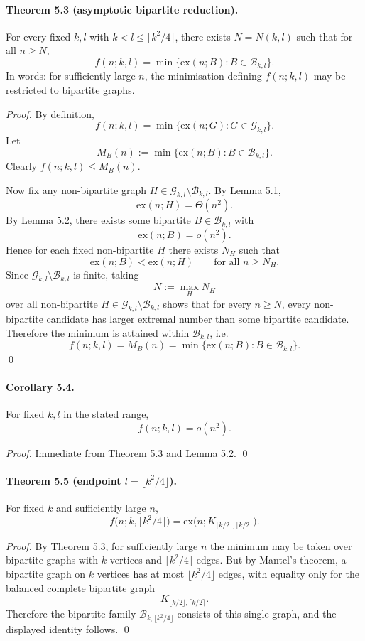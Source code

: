 \paragraph{Theorem 5.3 (asymptotic bipartite reduction).}
For every fixed $k,l$ with $k<l\le \lfloor k^2/4\rfloor$, there exists $N=N(k,l)$ such that for all $n\ge N$,
\[
f(n;k,l)=\min\{\mathrm{ex}(n;B): B\in \mathcal B_{k,l}\}.
\]
In words: for sufficiently large $n$, the minimisation defining $f(n;k,l)$ may be restricted to bipartite graphs.

\emph{Proof.}
By definition,
\[
f(n;k,l)=\min\{\mathrm{ex}(n;G): G\in \mathcal G_{k,l}\}.
\]
Let
\[
M_B(n):=\min\{\mathrm{ex}(n;B): B\in \mathcal B_{k,l}\}.
\]
Clearly $f(n;k,l)\le M_B(n)$.

Now fix any non-bipartite graph $H\in \mathcal G_{k,l}\setminus \mathcal B_{k,l}$. By Lemma 5.1,
\[
\mathrm{ex}(n;H)=\Theta(n^2).
\]
By Lemma 5.2, there exists some bipartite $B\in \mathcal B_{k,l}$ with
\[
\mathrm{ex}(n;B)=o(n^2).
\]
Hence for each fixed non-bipartite $H$ there exists $N_H$ such that
\[
\mathrm{ex}(n;B)<\mathrm{ex}(n;H)\qquad\text{for all }n\ge N_H.
\]
Since $\mathcal G_{k,l}\setminus \mathcal B_{k,l}$ is finite, taking
\[
N:=\max_H N_H
\]
over all non-bipartite $H\in \mathcal G_{k,l}\setminus \mathcal B_{k,l}$ shows that for every $n\ge N$, every non-bipartite candidate has larger extremal number than some bipartite candidate. Therefore the minimum is attained within $\mathcal B_{k,l}$, i.e.
\[
f(n;k,l)=M_B(n)=\min\{\mathrm{ex}(n;B): B\in \mathcal B_{k,l}\}.
\]
\qed

\paragraph{Corollary 5.4.}
For fixed $k,l$ in the stated range,
\[
f(n;k,l)=o(n^2).
\]

\emph{Proof.}
Immediate from Theorem 5.3 and Lemma 5.2. \qed

\paragraph{Theorem 5.5 (endpoint $l=\lfloor k^2/4\rfloor$).}
For fixed $k$ and sufficiently large $n$,
\[
f\bigl(n;k,\lfloor k^2/4\rfloor\bigr)=\mathrm{ex}\bigl(n;K_{\lfloor k/2\rfloor,\lceil k/2\rceil}\bigr).
\]

\emph{Proof.}
By Theorem 5.3, for sufficiently large $n$ the minimum may be taken over bipartite graphs with $k$ vertices and $\lfloor k^2/4\rfloor$ edges. But by Mantel's theorem, a bipartite graph on $k$ vertices has at most $\lfloor k^2/4\rfloor$ edges, with equality only for the balanced complete bipartite graph
\[
K_{\lfloor k/2\rfloor,\lceil k/2\rceil}.
\]
Therefore the bipartite family $\mathcal B_{k,\lfloor k^2/4\rfloor}$ consists of this single graph, and the displayed identity follows. \qed

